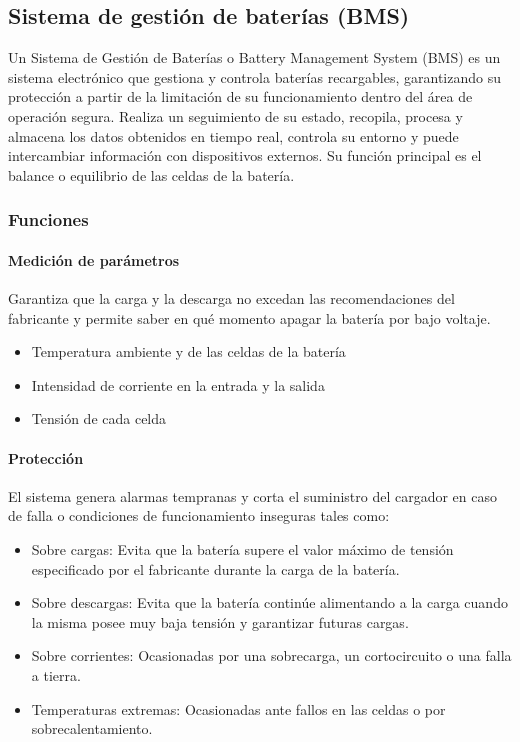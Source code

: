 \subsection{Sistema de gestión de baterías (BMS)}

Un Sistema de Gestión de Baterías o Battery Management System (BMS) es un sistema electrónico que gestiona y controla baterías recargables,
garantizando su protección a partir de la limitación de su funcionamiento dentro del área de operación segura.
Realiza un seguimiento de su estado, recopila, procesa y almacena los datos obtenidos en tiempo real, controla su entorno y puede intercambiar información con dispositivos externos.
Su función principal es el balance o equilibrio de las celdas de la batería.

\subsubsection{Funciones}

\paragraph{Medición de parámetros}
Garantiza que la carga y la descarga no excedan las recomendaciones del fabricante y permite saber en qué momento apagar la batería por bajo voltaje. 

\begin{itemize}
    \item Temperatura ambiente y de las celdas de la batería
    \item Intensidad de corriente en la entrada y la salida
    \item Tensión de cada celda
\end{itemize}

\paragraph{Protección}
El sistema genera alarmas tempranas y corta el suministro del cargador en caso de falla o condiciones de funcionamiento inseguras tales como:

\begin{itemize}
    \item Sobre cargas: Evita que la batería supere el valor máximo de tensión especificado por el fabricante durante la carga de la batería.
    \item Sobre descargas: Evita que la batería continúe alimentando a la carga cuando la misma posee muy baja tensión y garantizar futuras cargas. 
    \item Sobre corrientes: Ocasionadas por una sobrecarga, un cortocircuito o una falla a tierra.
    \item Temperaturas extremas: Ocasionadas ante fallos en las celdas o por sobrecalentamiento.
\end{itemize}

